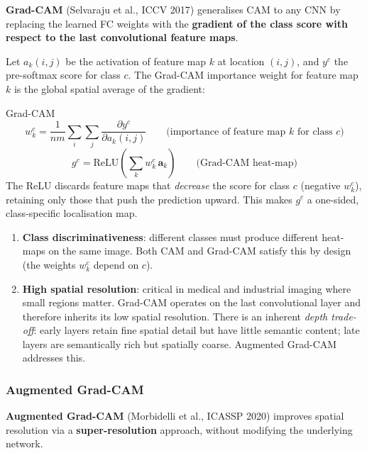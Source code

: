 \documentclass[11pt,a4paper]{article}
\newcommand{\term}[1]{\textcolor{DefGreen}{\textbf{#1}}}
\begin{document}
\term{Grad-CAM} (Selvaraju et al., ICCV 2017) generalises CAM to any CNN by replacing the learned FC weights with the \textbf{gradient of the class score with respect to the last convolutional feature maps}.

Let $a_k(i,j)$ be the activation of feature map $k$ at location $(i,j)$, and $y^c$ the pre-softmax score for class $c$. The Grad-CAM importance weight for feature map $k$ is the global spatial average of the gradient:

\begin{defbox}{Grad-CAM}
\[
w_k^c = \frac{1}{nm}\sum_i\sum_j \frac{\partial y^c}{\partial a_k(i,j)}
\qquad \text{(importance of feature map } k \text{ for class } c\text{)}
\]
\[
g^c = \mathrm{ReLU}\!\left(\sum_k w_k^c \, \mathbf{a}_k\right)
\qquad \text{(Grad-CAM heat-map)}
\]
The ReLU discards feature maps that \emph{decrease} the score for class $c$ (negative $w_k^c$), retaining only those that push the prediction upward. This makes $g^c$ a one-sided, class-specific localisation map.
\end{defbox}

\begin{notebox}
\begin{enumerate}
  \item \textbf{Class discriminativeness}: different classes must produce different heat-maps on the same image. Both CAM and Grad-CAM satisfy this by design (the weights $w_k^c$ depend on $c$).
  \item \textbf{High spatial resolution}: critical in medical and industrial imaging where small regions matter. Grad-CAM operates on the last convolutional layer and therefore inherits its low spatial resolution. There is an inherent \emph{depth trade-off}: early layers retain fine spatial detail but have little semantic content; late layers are semantically rich but spatially coarse. Augmented Grad-CAM addresses this.
\end{enumerate}
\end{notebox}

\subsubsection{Augmented Grad-CAM}
\label{sec:auggradcam2}

\term{Augmented Grad-CAM} (Morbidelli et al., ICASSP 2020) improves spatial resolution via a \textbf{super-resolution} approach, without modifying the underlying network.
\end{document}
